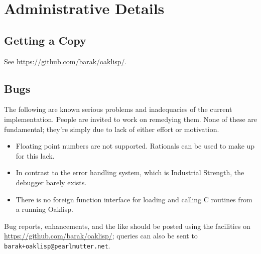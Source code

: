 %
%
%


\chapter{Administrative Details}

\section{Getting a Copy}

See \url{https://github.com/barak/oaklisp/}.

\section{Bugs}

The following are known serious problems and inadequacies of the
current implementation.  People are invited to work on remedying them.
None of these are fundamental; they're simply due to lack of either
effort or motivation.

\begin{itemize}
\item Floating point numbers are not supported.  Rationals can be
used to make up for this lack.

\item In contrast to the error handling system, which is Industrial
Strength, the debugger barely exists.

\item There is no foreign function interface for loading and calling
C routines from a running Oaklisp.

\end{itemize}

Bug reports, enhancements, and the like should be posted using the
facilities on \url{https://github.com/barak/oaklisp/}; queries can
also be sent to \texttt{barak+oaklisp@pearlmutter.net}.

